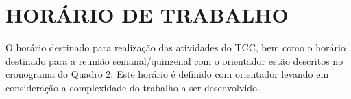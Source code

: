 \section{HORÁRIO DE TRABALHO}
\label{sec:horário}
O horário destinado para realização das atividades do TCC, bem como o horário destinado para a reunião semanal/quinzenal com o orientador estão descritos no cronograma do Quadro 2. Este horário é definido com orientador levando em consideração a complexidade do trabalho a ser desenvolvido.

